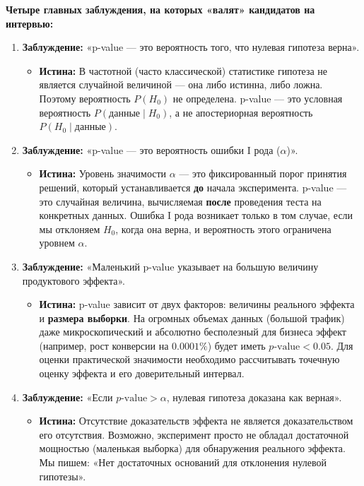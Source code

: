 \documentclass[12pt]{article}
\begin{document}
\textbf{Четыре главных заблуждения, на которых «валят» кандидатов на интервью:}
\begin{enumerate}
    \item \textbf{Заблуждение:} «p-value --- это вероятность того, что нулевая гипотеза верна».
    \begin{itemize}
        \item \textbf{Истина:} В частотной (часто классической) статистике гипотеза не является случайной величиной --- она либо истинна, либо ложна. Поэтому вероятность $P(H_0)$ не определена. p-value --- это условная вероятность $P(\text{данные} \mid H_0)$, а не апостериорная вероятность $P(H_0 \mid \text{данные})$.
    \end{itemize}
    \item \textbf{Заблуждение:} «p-value --- это вероятность ошибки I рода ($\alpha$)».
    \begin{itemize}
        \item \textbf{Истина:} Уровень значимости $\alpha$ --- это фиксированный порог принятия решений, который устанавливается \textbf{до} начала эксперимента. p-value --- это случайная величина, вычисляемая \textbf{после} проведения теста на конкретных данных. Ошибка I рода возникает только в том случае, если мы отклоняем $H_0$, когда она верна, и вероятность этого ограничена уровнем $\alpha$.
    \end{itemize}
    \item \textbf{Заблуждение:} «Маленький p-value указывает на большую величину продуктового эффекта».
    \begin{itemize}
        \item \textbf{Истина:} p-value зависит от двух факторов: величины реального эффекта и \textbf{размера выборки}. На огромных объемах данных (большой трафик) даже микроскопический и абсолютно бесполезный для бизнеса эффект (например, рост конверсии на $0.0001\%$) будет иметь $p\text{-value} < 0.05$. Для оценки практической значимости необходимо рассчитывать точечную оценку эффекта и его доверительный интервал.
    \end{itemize}
    \item \textbf{Заблуждение:} «Если $p\text{-value} > \alpha$, нулевая гипотеза доказана как верная».
    \begin{itemize}
        \item \textbf{Истина:} Отсутствие доказательств эффекта не является доказательством его отсутствия. Возможно, эксперимент просто не обладал достаточной мощностью (маленькая выборка) для обнаружения реального эффекта. Мы пишем: «Нет достаточных оснований для отклонения нулевой гипотезы».
    \end{itemize}
\end{enumerate}
\end{document}
